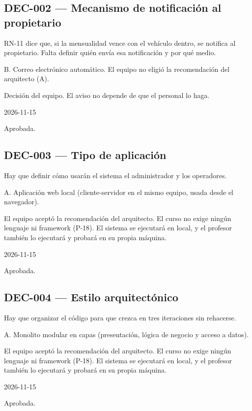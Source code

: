 \subsection{DEC-002 — Mecanismo de notificación al propietario}
\begin{description}[style=nextline]
  \item[Problema] RN-11 dice que, si la mensualidad vence con el vehículo dentro, se notifica al propietario. Falta definir quién envía esa notificación y por qué medio.
  \item[Decisión seleccionada] B. Correo electrónico automático. El equipo no eligió la recomendación del arquitecto (A).
  \item[Justificación] Decisión del equipo. El aviso no depende de que el personal lo haga.
  \item[Fecha] 2026-11-15
  \item[Estado] Aprobada.
\end{description}
\subsection{DEC-003 — Tipo de aplicación}
\begin{description}[style=nextline]
  \item[Problema] Hay que definir cómo usarán el sistema el administrador y los operadores.
  \item[Decisión seleccionada] A. Aplicación web local (cliente-servidor en el mismo equipo, usada desde el navegador).
  \item[Justificación] El equipo aceptó la recomendación del arquitecto. El curso no exige ningún lenguaje ni framework (P-18). El sistema se ejecutará en local, y el profesor también lo ejecutará y probará en su propia máquina.
  \item[Fecha] 2026-11-15
  \item[Estado] Aprobada.
\end{description}
\subsection{DEC-004 — Estilo arquitectónico}
\begin{description}[style=nextline]
  \item[Problema] Hay que organizar el código para que crezca en tres iteraciones sin rehacerse.
  \item[Decisión seleccionada] A. Monolito modular en capas (presentación, lógica de negocio y acceso a datos).
  \item[Justificación] El equipo aceptó la recomendación del arquitecto. El curso no exige ningún lenguaje ni framework (P-18). El sistema se ejecutará en local, y el profesor también lo ejecutará y probará en su propia máquina.
  \item[Fecha] 2026-11-15
  \item[Estado] Aprobada.
\end{description}
